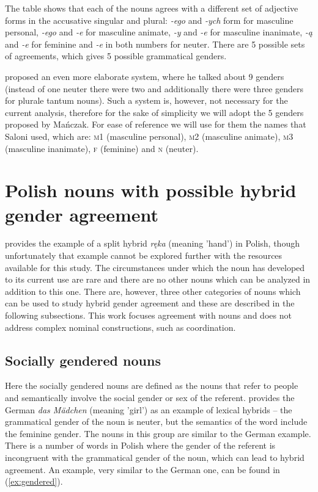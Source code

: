 The table shows that each of the nouns agrees with a different set of adjective forms in the accusative singular and plural: \textsl{-ego} and \textsl{-ych} form for masculine personal, \textsl{-ego} and \textsl{-e} for masculine animate, \textsl{-y} and \textsl{-e} for masculine inanimate, \textsl{-ą} and \textsl{-e} for feminine and \textsl{-e} in both numbers for neuter. There are 5 possible sets of agreements, which gives 5 possible grammatical genders.

\cite{saloni_kategoria_1976} proposed an even more elaborate system, where he talked about 9 genders (instead of one neuter there were two and additionally there were three genders for plurale tantum nouns). Such a system is, however, not necessary for the current analysis, therefore for the sake of simplicity we will adopt the 5 genders proposed by Mańczak. For ease of reference we will use for them the names that Saloni used, which are: \textsc{m1} (masculine personal), \textsc{m2} (masculine animate), \textsc{m3} (masculine inanimate), \textsc{f} (feminine) and \textsc{n} (neuter).

\section{Polish nouns with possible hybrid gender agreement}
\cite{corbett_agreement_2023} provides the example of a split hybrid \textsl{ręka} (meaning 'hand') in Polish, though unfortunately that example cannot be explored further with the resources available for this study. The circumstances under which the noun has developed to its current use are rare and there are no other nouns which can be analyzed in addition to this one. There are, however, three other categories of nouns which can be used to study hybrid gender agreement and these are described in the following subsections. This work focuses agreement with nouns and does not address complex nominal constructions, such as coordination.

\vspace{-1cm}
\subsection{Socially gendered nouns}
Here the socially gendered nouns are defined as the nouns that refer to people and semantically involve the social gender or sex of the referent. \cite{corbett_agreement_2023} provides the German \textsl{das M{\"a}dchen} (meaning 'girl') as an example of lexical hybrids -- the grammatical gender of the noun is neuter, but the semantics of the word include the feminine gender. The nouns in this group are similar to the German example. There is a number of words in Polish where the gender of the referent is incongruent with the grammatical gender of the noun, which can lead to hybrid agreement. An example, very similar to the German one, can be found in (\ref{ex:gendered}). 


